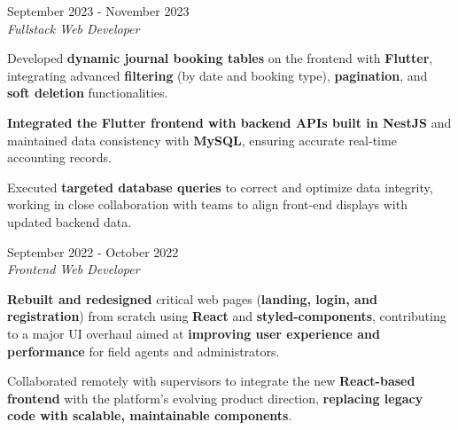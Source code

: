 \documentclass[../main.tex]{subfiles}
\begin{document}
\vspace{0.4 cm}

\begin{twocolentry}{September 2023 - November 2023}
     \\
    \vspace{0.10 cm}
    \textit{Fullstack Web Developer}
\end{twocolentry}

\vspace{0.10 cm}
\begin{onecolentry}
\begin{highlights}
    \item Developed \textbf{dynamic journal booking tables} on the frontend with \textbf{Flutter}, integrating advanced \textbf{filtering} (by date and booking type), \textbf{pagination}, and \textbf{soft deletion} functionalities.
    \item \textbf{Integrated the Flutter frontend with backend APIs built in NestJS} and maintained data consistency with \textbf{MySQL}, ensuring accurate real-time accounting records.
    \item Executed \textbf{targeted database queries} to correct and optimize data integrity, working in close collaboration with teams to align front-end displays with updated backend data.
\end{highlights}
\end{onecolentry}

\vspace{0.4 cm}

\begin{twocolentry}{September 2022 - October 2022}
     \\
    \vspace{0.10 cm}
    \textit{Frontend Web Developer}
\end{twocolentry}

\vspace{0.10 cm}
\begin{onecolentry}
\begin{highlights}
    \item \textbf{Rebuilt and redesigned} critical web pages (\textbf{landing, login, and registration}) from scratch using \textbf{React} and \textbf{styled-components}, contributing to a major UI overhaul aimed at \textbf{improving user experience and performance} for field agents and administrators.
    \item Collaborated remotely with supervisors to integrate the new \textbf{React-based frontend} with the platform’s evolving product direction, \textbf{replacing legacy code with scalable, maintainable components}.
\end{highlights}
\end{onecolentry}
\end{document}

